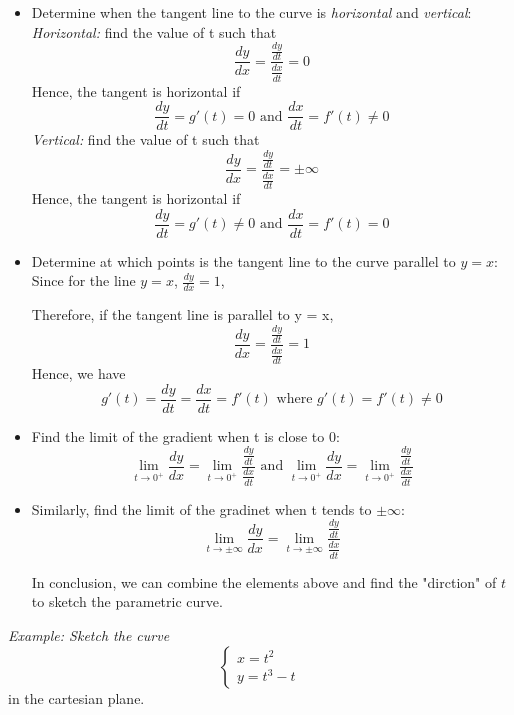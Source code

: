 \documentclass[12pt]{report}
\begin{document}
\begin{itemize}
    \item Determine when the tangent line to the curve is \emph{horizontal} and \emph{vertical}:
    \newpage
    \emph{Horizontal:} find the value of t such that
    $$
    \frac{dy}{dx} = \frac{\frac{dy}{dt}}{\frac{dx}{dt}} = 0
    $$
     \indent Hence, the tangent is horizontal if
     $$
    \frac{dy}{dt} =  g'(t) = 0 \text{ and }\frac{dx}{dt} = f'(t) \neq 0
     $$
     \emph{Vertical:} find the value of t such that
     $$
     \frac{dy}{dx} = \frac{\frac{dy}{dt}}{\frac{dx}{dt}} = \pm \infty
     $$
     \indent Hence, the tangent is horizontal if
     $$
    \frac{dy}{dt} =  g'(t) \neq 0\text{ and } \frac{dx}{dt} = f'(t) = 0
     $$
    \item Determine at which points is the tangent line to the curve parallel to $y = x$:
    \newline Since for the line $y = x$, $\frac{dy}{dx} = 1$,

    Therefore, if the tangent line is parallel to y = x, 
    $$
    \frac{dy}{dx} = \frac{\frac{dy}{dt}}{\frac{dx}{dt}} = 1
    $$
    \newline Hence, we have 
    $$
    g'(t) = \frac{dy}{dt} = \frac{dx}{dt} = f'(t)
    \text{ where } g'(t) = f'(t) \neq 0$$
    \item Find the limit of the gradient when t is close to 0:
    \newline  $$
    \lim_{t \to 0^+} \frac{dy}{dx} = \lim_{t \to 0^+} \frac{\frac{dy}{dt}}{\frac{dx}{dt}}
    \text{ and }
    \lim_{t \to 0^+} \frac{dy}{dx} = \lim_{t \to 0^+} \frac{\frac{dy}{dt}}{\frac{dx}{dt}}
    $$
    \item Similarly, find the limit of the gradinet when t tends to $\pm \infty$:
    \newline $$
    \lim_{t \to \pm \infty} \frac{dy}{dx} = \lim_{t \to \pm \infty} \frac{\frac{dy}{dt}}{\frac{dx}{dt}}
    $$
    
    In conclusion, we can combine the elements above and find the "dirction" of $t$ to sketch the parametric curve. 
\end{itemize}
 
\newpage
\emph{Example: Sketch the curve}
$$
\left\{\begin{array}{ll}
x = t^2 
\\ y = t^3 - t
\end{array}\right.
$$
\indent in the cartesian plane.
\end{document}
